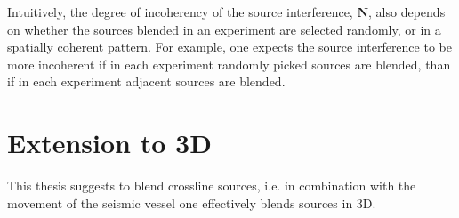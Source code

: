 Intuitively, the degree of incoherency of the source interference, $\mathbf{N}$, also depends on whether the sources blended in an experiment are selected randomly, or in a spatially coherent pattern. For example, one expects the source interference to be more incoherent if in each experiment randomly picked sources are blended, than if in each experiment adjacent sources are blended.

\FloatBarrier

\section{Extension to 3D} \label{sec:MahdadMethod3d}

This thesis suggests to blend crossline sources, i.e. in combination with the movement of the seismic vessel one effectively blends sources in 3D.

